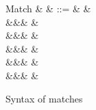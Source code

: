 \begin{figure}
\begin{syntaxfig}
\mbox{Match}
&
\xi
&
::=
&
&
\\
&&&
\matchUnit{\matchHole{}}
&
\\
&&&
\matchSumL{\xi}
&
\\
&&&
\matchSumR{\xi}
&
\\
&&&
&
\\
&&&
\matchRoll{\xi}
&
\end{syntaxfig}
\caption{Syntax of matches}
\end{figure}

